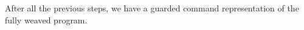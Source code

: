 After all the previous steps, we have a guarded command representation
of the fully weaved program.
